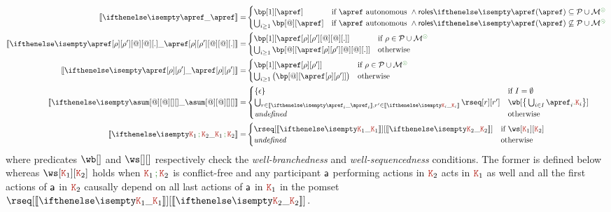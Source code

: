 \begin{align*}
  \ksem{\apref} =
  &
    \begin{cases}
      \bp[1][\apref]
      & \text{if $\apref$ autonomous } \land \roles{\apref} \subseteq \participants \cup \multiroles^\unknownop
      \\
      \bigcup_{i \geq 1}\bp[@][\apref]
      & \text{if $\apref$ autonomous } \land \roles{\apref} \not\subseteq \participants \cup \multiroles^\unknownop
    \end{cases}
  \\
  \ksem{\apref[\arole][\arole'][@][@][.]} =
  &
    \begin{cases}
      \bp[1][{\apref[\arole][\arole'][@][@][.]}]
      & \text{if } \arole \in \participants \cup \multiroles^\unknownop
      \\
      \bigcup_{i \geq 1}\bp[@][{\apref[\arole][\arole'][@][@][.]}]
      & \text{otherwise}
    \end{cases}
  \\
  \ksem{\apref[\arole][\arole']} =
  &
    \begin{cases}
      \bp[1][{\apref[\arole][\arole']}]
      & \text{if } \arole \in \participants \cup \multiroles^\unknownop
      \\
      \bigcup_{i \geq 1}\big(\bp[@][{\apref[\arole][\arole']}]\big)
      & \text{otherwise}
    \end{cases}
  \\
  \ksem{\asum[@][@][][]} =
  &
    \begin{cases}
      \{ \emptypom \} & \text{if } I = \emptyset
      \\
      \bigcup_{\apom \in \ksem{\apref_i},\apom' \in \ksem{\aK_i}} \rseq[\apom][\apom']
      & \wb[{\big\{\bigcup_{i \in I}\apref_i\mkop{.}\aK_i\big\}}]
      \\
      \mathit{undefined} & \text{otherwise}
    \end{cases}
  \\
  \ksem{\aK_1 \seqop \aK_2} =
  &
    \begin{cases}
      \rseq[\ksem{\aK_1}][\ksem{\aK_2}] & \text{if } \ws[\aK_1][\aK_2]
      \\
      \mathit{undefined} & \text{otherwise}
    \end{cases}
\end{align*}
where predicates $\wb[]$ and $\ws[][]$ respectively check the
\emph{well-branchedness} and \emph{well-sequencedness} conditions.
%
The former is defined below whereas $\ws[\aK_1][\aK_2]$ holds when
$\aK_1 \seqop \aK_2$ is conflict-free and any participant $\ptp a$
performing actions in $\aK_2$ acts in $\aK_1$ as well and all the
first actions of $\ptp a$ in $\aK_2$ causally depend on all last
actions of $\ptp a$ in $\aK_1$ in the pomset
$\rseq[\ksem{\aK_1}][{\ksem{\aK_2}}]$.

